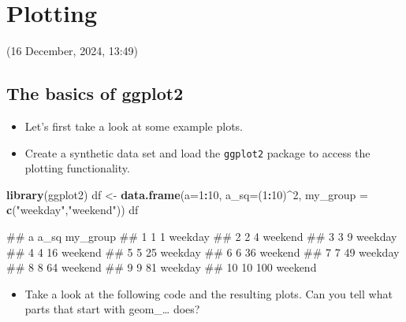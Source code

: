 \documentclass[
]{book}
\newenvironment{Shaded}{\begin{snugshade}}{\end{snugshade}}
\newcommand{\AttributeTok}[1]{\textcolor[rgb]{0.13,0.29,0.53}{#1}}
\newcommand{\DecValTok}[1]{\textcolor[rgb]{0.00,0.00,0.81}{#1}}
\newcommand{\FunctionTok}[1]{\textcolor[rgb]{0.13,0.29,0.53}{\textbf{#1}}}
\newcommand{\NormalTok}[1]{#1}
\newcommand{\OtherTok}[1]{\textcolor[rgb]{0.56,0.35,0.01}{#1}}
\newcommand{\SpecialCharTok}[1]{\textcolor[rgb]{0.81,0.36,0.00}{\textbf{#1}}}
\newcommand{\StringTok}[1]{\textcolor[rgb]{0.31,0.60,0.02}{#1}}
\providecommand{\tightlist}{%
  \setlength{\itemsep}{0pt}\setlength{\parskip}{0pt}}
\begin{document}
\chapter{Plotting}\label{plotting-1}

(16 December, 2024, 13:49)

\section{The basics of ggplot2}\label{the-basics-of-ggplot2}

\begin{itemize}
\tightlist
\item
  Let's first take a look at some example plots.
\item
  Create a synthetic data set and load the \texttt{ggplot2} package to access the plotting functionality.
\end{itemize}

\begin{Shaded}
\begin{Highlighting}[]
\FunctionTok{library}\NormalTok{(ggplot2)}
\NormalTok{df }\OtherTok{\textless{}{-}} \FunctionTok{data.frame}\NormalTok{(}\AttributeTok{a=}\DecValTok{1}\SpecialCharTok{:}\DecValTok{10}\NormalTok{, }\AttributeTok{a\_sq=}\NormalTok{(}\DecValTok{1}\SpecialCharTok{:}\DecValTok{10}\NormalTok{)}\SpecialCharTok{\^{}}\DecValTok{2}\NormalTok{, }\AttributeTok{my\_group =} \FunctionTok{c}\NormalTok{(}\StringTok{"weekday"}\NormalTok{,}\StringTok{"weekend"}\NormalTok{))}
\NormalTok{df}
\end{Highlighting}
\end{Shaded}

\begin{Shaded}
\begin{Highlighting}[]
\NormalTok{\#\#     a a\_sq my\_group}
\NormalTok{\#\# 1   1    1  weekday}
\NormalTok{\#\# 2   2    4  weekend}
\NormalTok{\#\# 3   3    9  weekday}
\NormalTok{\#\# 4   4   16  weekend}
\NormalTok{\#\# 5   5   25  weekday}
\NormalTok{\#\# 6   6   36  weekend}
\NormalTok{\#\# 7   7   49  weekday}
\NormalTok{\#\# 8   8   64  weekend}
\NormalTok{\#\# 9   9   81  weekday}
\NormalTok{\#\# 10 10  100  weekend}
\end{Highlighting}
\end{Shaded}

\begin{itemize}
\tightlist
\item
  Take a look at the following code and the resulting plots. Can you tell what parts that start with geom\_\ldots{} does?
\end{itemize}
\end{document}
